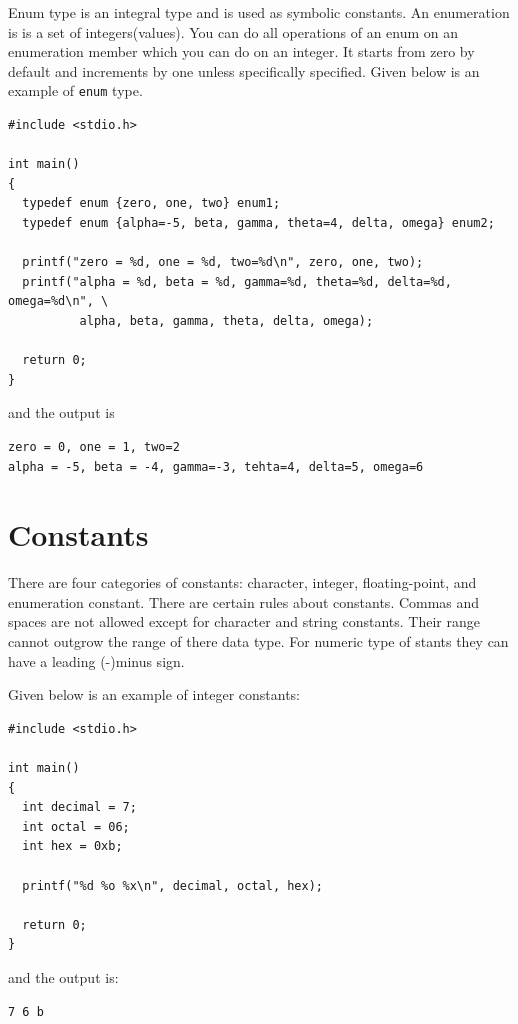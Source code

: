 Enum type is an integral type and is used as symbolic constants. An enumeration
is is a set of integers(values). You can do all operations of an enum on an
enumeration member which you can do on an integer. It starts from zero by
default and increments by one unless specifically specified. Given below is an
example of \texttt{enum} type.

\begin{Verbatim}[frame=single]
#include <stdio.h>

int main()
{
  typedef enum {zero, one, two} enum1;
  typedef enum {alpha=-5, beta, gamma, theta=4, delta, omega} enum2;

  printf("zero = %d, one = %d, two=%d\n", zero, one, two);
  printf("alpha = %d, beta = %d, gamma=%d, theta=%d, delta=%d, omega=%d\n", \
          alpha, beta, gamma, theta, delta, omega);

  return 0;
}
\end{Verbatim}

and the output is

\begin{Verbatim}[frame=single]
zero = 0, one = 1, two=2
alpha = -5, beta = -4, gamma=-3, tehta=4, delta=5, omega=6
\end{Verbatim}

\section{Constants}
There are four categories of constants: character, integer, floating-point, and
enumeration constant. There are certain rules about constants. Commas and
spaces are not allowed except for character and string constants. Their range
cannot outgrow the range of there data type. For numeric type of stants they
can have a leading (-)minus sign.

Given below is an example of integer constants:

\begin{Verbatim}[frame=single]
#include <stdio.h>

int main()
{
  int decimal = 7;
  int octal = 06;
  int hex = 0xb;

  printf("%d %o %x\n", decimal, octal, hex);

  return 0;
}
\end{Verbatim}

and the output is:

\begin{Verbatim}[frame=single]
7 6 b
\end{Verbatim}

